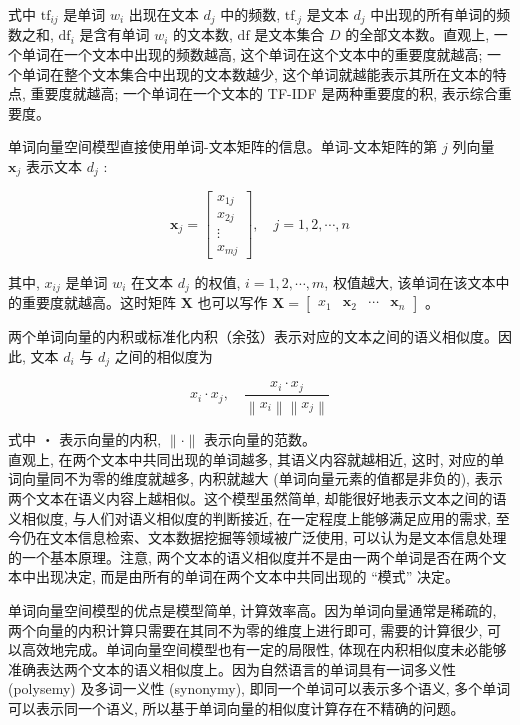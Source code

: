\documentclass[10pt]{article}
\begin{document}
式中 $\mathrm{tf}_{i j}$ 是单词 $w_{i}$ 出现在文本 $d_{j}$ 中的频数, $\mathrm{tf}_{\cdot j}$ 是文本 $d_{j}$ 中出现的所有单词的频数之和, $\mathrm{df}_{i}$ 是含有单词 $w_{i}$ 的文本数, $\mathrm{df}$ 是文本集合 $D$ 的全部文本数。直观上, 一个单词在一个文本中出现的频数越高, 这个单词在这个文本中的重要度就越高; 一个单词在整个文本集合中出现的文本数越少, 这个单词就越能表示其所在文本的特点, 重要度就越高; 一个单词在一个文本的 TF-IDF 是两种重要度的积, 表示综合重要度。

单词向量空间模型直接使用单词-文本矩阵的信息。单词-文本矩阵的第 $j$ 列向量 $\boldsymbol{x}_{j}$ 表示文本 $d_{j}$ :

\[
\boldsymbol{x}_{j}=\left[\begin{array}{c}
x_{1 j}  \tag{17.3}\\
x_{2 j} \\
\vdots \\
x_{m j}
\end{array}\right], \quad j=1,2, \cdots, n
\]

其中, $x_{i j}$ 是单词 $w_{i}$ 在文本 $d_{j}$ 的权值, $i=1,2, \cdots, m$, 权值越大, 该单词在该文本中的重要度就越高。这时矩阵 $\boldsymbol{X}$ 也可以写作 $\boldsymbol{X}=\left[\begin{array}{llll}x_{1} & \boldsymbol{x}_{2} & \cdots & \boldsymbol{x}_{n}\end{array}\right]$ 。

两个单词向量的内积或标准化内积（余弦）表示对应的文本之间的语义相似度。因此, 文本 $d_{i}$ 与 $d_{j}$ 之间的相似度为


\begin{equation*}
x_{i} \cdot x_{j}, \quad \frac{x_{i} \cdot x_{j}}{\left\|x_{i}\right\|\left\|x_{j}\right\|} \tag{17.4}
\end{equation*}


式中 ・ 表示向量的内积, $\|\cdot\|$ 表示向量的范数。\\
直观上, 在两个文本中共同出现的单词越多, 其语义内容就越相近, 这时, 对应的单词向量同不为零的维度就越多, 内积就越大 (单词向量元素的值都是非负的), 表示两个文本在语义内容上越相似。这个模型虽然简单, 却能很好地表示文本之间的语义相似度, 与人们对语义相似度的判断接近, 在一定程度上能够满足应用的需求, 至今仍在文本信息检索、文本数据挖掘等领域被广泛使用, 可以认为是文本信息处理的一个基本原理。注意, 两个文本的语义相似度并不是由一两个单词是否在两个文本中出现决定, 而是由所有的单词在两个文本中共同出现的 “模式” 决定。

单词向量空间模型的优点是模型简单, 计算效率高。因为单词向量通常是稀疏的, 两个向量的内积计算只需要在其同不为零的维度上进行即可, 需要的计算很少, 可以高效地完成。单词向量空间模型也有一定的局限性, 体现在内积相似度未必能够准确表达两个文本的语义相似度上。因为自然语言的单词具有一词多义性 (polysemy) 及多词一义性 (synonymy), 即同一个单词可以表示多个语义, 多个单词可以表示同一个语义, 所以基于单词向量的相似度计算存在不精确的问题。
\end{document}
